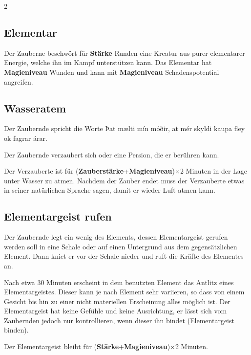 \begin{multicols*}{2}
\subsection{Elementar}

Der Zauberne beschwört für \textbf{Stärke} Runden eine Kreatur aus purer elementarer Energie, welche ihn im Kampf unterstützen kann. Das Elementar hat \textbf{Magieniveau} Wunden und kann mit \textbf{Magieniveau} Schadenspotential angreifen.



\subsection{Wasseratem}

Der Zaubernde spricht die Worte Þat mælti mín móðir, at mér skyldi kaupa fley ok fagrar árar.

Der Zaubernde verzaubert sich oder eine Persion, die er berühren kann.

Der Verzauberte ist für (\textbf{Zauberstärke}+\textbf{Magieniveau})×2 Minuten in der Lage unter Wasser zu atmen. Nachdem der Zauber endet muss der Verzauberte etwas in seiner natürlichen Sprache sagen, damit er wieder Luft atmen kann.



\subsection{Elementargeist rufen}

Der Zaubernde legt ein wenig des Elements, dessen Elementargeist gerufen werden soll in eine Schale oder auf einen Untergrund aus dem gegensätzlichen Element. Dann kniet er vor der Schale nieder und ruft die Kräfte des Elementes an.

Nach etwa 30 Minuten erscheint in dem benutzten Element das Antlitz eines Elementargeistes. Dieser kann je nach Element sehr variieren, so dass von einem Gesicht bis hin zu einer nicht materiellen Erscheinung alles möglich ist. Der Elementargeist hat keine Gefühle und keine Ausrichtung, er lässt sich vom Zaubernden jedoch nur kontrollieren, wenn dieser ihn bindet (Elementargeist binden).

Der Elementargeist bleibt für (\textbf{Stärke}+\textbf{Magieniveau})×2 Minuten.


\end{multicols*}
